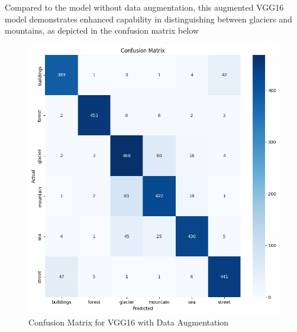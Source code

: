 \documentclass[conference]{IEEEtran}
\begin{document}
Compared to the model without data augmentation, this augmented VGG16 model demonstrates enhanced capability in distinguishing between glaciers and mountains, as depicted in the confusion matrix below

\begin{figure}[H]
    \centering
    \includegraphics[width=1\linewidth]{images//VGG16/CM_VGG1&_DA.png}
    \caption{Confusion Matrix for VGG16 with Data Augmentation}
    \label{fig:CM_VGG_Da}
\end{figure}
\end{document}
